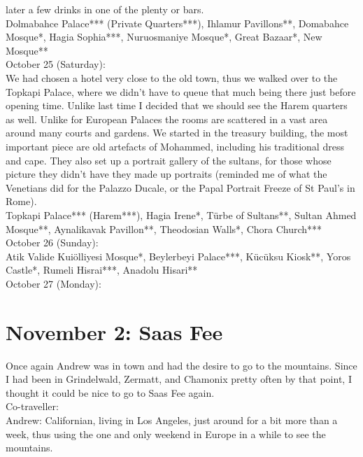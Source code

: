 later a few drinks in one of the plenty or bars.\\

Dolmabahce Palace*** (Private Quarters***), Ihlamur Pavillons**, Domabahce Mosque*, Hagia Sophia***, Nuruosmaniye Mosque*, Great Bazaar*, New Mosque**\\

October 25 (Saturday):\\
We had chosen a hotel very close to the old town, thus we walked over to the Topkapi Palace, where we didn't have to queue that much being there just before opening time. Unlike last time I decided that we should see the Harem quarters as well. Unlike for European Palaces the rooms are scattered in a vast area around many courts and gardens. We started in the treasury building, the most important piece are old artefacts of Mohammed, including his traditional dress and cape. They also set up a portrait gallery of the sultans, for those whose picture they didn't have they made up portraits (reminded me of what the Venetians did for the Palazzo Ducale, or the Papal Portrait Freeze of St Paul's in Rome). \\

Topkapi Palace*** (Harem***), Hagia Irene*, T\"urbe of Sultans**, Sultan Ahmed Mosque**, Aynalikavak Pavillon**, Theodosian Walls*, Chora Church***\\

October 26 (Sunday):\\
Atik Valide Kui\"olliyesi Mosque*, Beylerbeyi Palace***, K\"uc\"uksu Kiosk**, Yoros Castle*, Rumeli Hisrai***, Anadolu Hisari**\\

October 27 (Monday):\\

\section{November 2: Saas Fee}
\label{SaasFee2014}

Once again Andrew was in town and had the desire to go to the mountains. Since I had been in Grindelwald, Zermatt, and Chamonix pretty often by that point, I thought it could be nice to go to Saas Fee again.\\

Co-traveller:\\
Andrew: Californian, living in Los Angeles, just around for a bit more than a week, thus using the one and only weekend in Europe in a while to see the mountains.\\

